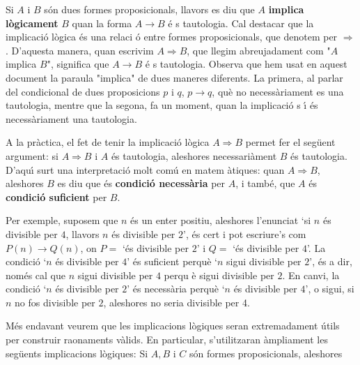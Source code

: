 Si $A$ i $B$ s\'{o}n dues formes proposicionals, llavors es diu que $A$
\textbf{implica l\`{o}gicament} $B$ quan la forma $A\longrightarrow B$ \'{e}%
s tautologia. Cal destacar que la implicaci\'{o} l\`{o}gica \'{e}s una relaci%
\'{o} entre formes proposicionals, que denotem per $\Longrightarrow$.
D'aquesta manera, quan escrivim $A\Longrightarrow B$, que llegim
abreujadament com "$A$ implica $B$", significa que $A\longrightarrow B$ \'{e}%
s tautologia. Observa que hem usat en aquest document la paraula "implica"
de dues maneres diferents. La primera, al parlar del condicional de dues
proposicions $p$ i $q$, $p\rightarrow q$, qu\`{e} no necess\`{a}riament es
una tautologia, mentre que la segona, fa un moment, quan la implicaci\'{o} s%
\'{\i} \'{e}s necess\`{a}riament una tautologia.

A la pr\`{a}ctica, el fet de tenir la implicaci\'{o} l\`{o}gica $%
A\Longrightarrow B$ permet fer el seg\"{u}ent argument: si $A\Longrightarrow
B$ i $A$ \'{e}s tautologia, aleshores necessari\`{a}ment $B$ \'{e}s
tautologia. D'aqu\'{\i} surt una interpretaci\'{o} molt com\'{u} en matem%
\`{a}tiques: quan $A\Longrightarrow B$, aleshores $B$ es diu que \'{e}s
\textbf{condici\'{o} necess\`{a}ria} per $A$, i tamb\'{e}, que $A$ \'{e}s
\textbf{condici\'{o} suficient} per $B$.

Per exemple, suposem que $n$ \'{e}s un enter positiu, aleshores l'enunciat
`si $n$ \'{e}s divisible per $4$, llavors $n$ \'{e}s divisible per $2$',
\'{e}s cert i pot escriure's com $P(n)\longrightarrow Q(n)$, on $P=$ `\'{e}s
divisible per $2$' i $Q=$ `\'{e}s divisible per $4$'. La condici\'{o} `$n$
\'{e}s divisible per $4$' \'{e}s suficient perqu\`{e} `$n$ sigui divisible
per $2$', \'{e}s a dir, nom\'{e}s cal que $n$ sigui divisible per $4$ perqu%
\`{e} sigui divisible per $2$. En canvi, la condici\'{o} `$n$ \'{e}s
divisible per $2$' \'{e}s necess\`{a}ria perqu\`{e} `$n$ \'{e}s divisible
per $4$', o sigui, si $n$ no fos divisible per $2$, aleshores no seria
divisible per 4.

M\'{e}s endavant veurem que les implicacions l\`{o}giques seran
extremadament \'{u}tils per construir raonaments v\`{a}lids. En particular,
s'utilitzaran \`{a}mpliament les seg\"{u}ents implicacions l\`{o}giques: Si $%
A,B$ i $C$ s\'{o}n formes proposicionals, aleshores

